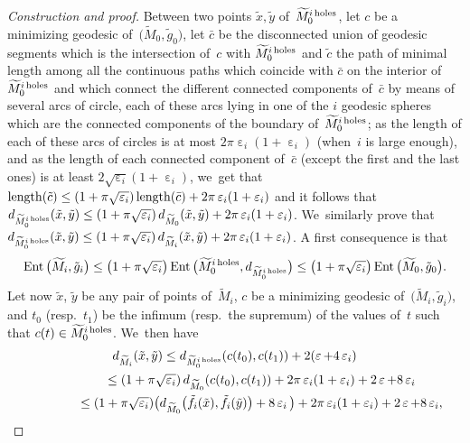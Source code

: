 \documentclass[10pt,a4paper]{amsart}
\numberwithin{equation}{section}
\newcommand{\Ent}{\operatorname{Ent}}
\newcommand{\e}{\operatorname{\varepsilon}}
\begin{document}
\begin{proof}[Construction and proof]
Between two points $\tilde x, \tilde y$ of~$\widetilde M_0^{i {\rm \, holes}}$, let $c$ be a minimizing geodesic of~$\big(\widetilde M_0, \tilde g_0\big)$, let $\bar c$ be
the disconnected union of geodesic segments which is the intersection of~$c$ with $\widetilde M_0^{i {\rm \, holes}}$ and $\tilde c$ the path of minimal length
among all the continuous paths which coincide with $\bar c$ on the interior of~$\widetilde M_0^{i {\rm \, holes}}$ and which connect the different
connected
components of~$\bar c$ by means of several arcs of circle, each of these arcs lying in one of the $i$ geodesic spheres which are the connected components of
the boundary of~$\widetilde M_0^{i {\rm \, holes}}$; as the length of each of these arcs of circles is at most $2 \pi \e_i (1 + \e_i)$ (when~$i$ is large enough),
and as the length of each connected component of~$\bar c$ (except the first and the last ones) is at least $2 \sqrt{\e_i} (1+\e_i)$, we~get that
${\rm length} (\tilde c) \le (1 + \pi \sqrt{\e_i})\, {\rm length} (\bar
c) + 2 \pi \e_i (1 + \e_i)$ and it follows that
$d_{\widetilde M_0^{i {\rm \, holes}}}(\tilde x,\tilde y) \le (1 + \pi \sqrt{\e_i})\, d_{\widetilde M_0 } (\tilde x, \tilde y) + 2 \pi \e_i (1 + \e_i)$. We~similarly prove that
$d_{\widetilde M_0^{i {\rm \, holes}}}(\tilde x,\tilde y) \le (1 + \pi \sqrt{\e_i})\, d_{\widetilde M_i } (\tilde x, \tilde y) + 2 \pi \e_i (1 + \e_i)$. A first consequence is that
\begin{gather*}
\Ent \big(\widetilde M_i, \tilde g_i\big) \le \big(1 + \pi \sqrt{\e_i}\big)
\Ent \big(\widetilde M_0^{i {\rm \, holes}}, d_{\widetilde M_0^{i {\rm \, holes}}}\big)
\le \big(1 + \pi \sqrt{\e_i}\big) \Ent \big(\widetilde M_0, \tilde g_0\big).
 \end{gather*}
Let now $\tilde x$, $\tilde y$ be any pair of points of~$\widetilde M_i$, $c$ be a minimizing geodesic of~$\big(\widetilde M_i, \tilde g_i\big)$, and $t_0$ (resp.~$t_1$) be the infimum (resp.\ the supremum) of the values of~$t$ such that $c(t) \in \widetilde M_0^{i {\rm \, holes}}$. We~then have
\begin{gather*}
d_{\widetilde M_i} (\tilde x, \tilde y) \le d_{\widetilde M_0^{i {\rm
\, holes}}} (c(t_0), c(t_1)) + 2 (\e + 4 \e_i)
\\ \hphantom{d_{\widetilde M_i} (\tilde x, \tilde y)}
{}\le (1 + \pi \sqrt{\e_i}) \, d_{\widetilde M_0}
( c(t_0), c(t_1)) + 2 \pi \e_i (1 + \e_i) + 2 \e + 8 \e_i
\\ \hphantom{d_{\widetilde M_i } (\tilde x, \tilde y)}
{}\le (1 + \pi \sqrt{\e_i}) \big(d_{\widetilde M_0 } \big(\tilde f_i (\tilde x), \tilde f_i (\tilde y) \big) + 8 \e_i \big) + 2 \pi \e_i (1 + \e_i) + 2 \e + 8 \e_i,

\end{gather*}
\end{proof}
\end{document}
